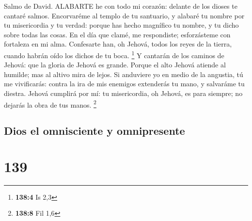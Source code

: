  Salmo de David. ALABARTE he con todo mi corazón: delante de
los dioses te cantaré salmos.  Encorvaréme al templo de tu
santuario, y alabaré tu nombre por tu misericordia y tu verdad: porque
has hecho magnífico tu nombre, y tu dicho sobre todas las cosas.
 En el día que clamé, me respondiste; esforzásteme con
fortaleza en mi alma.  Confesarte han, oh Jehová, todos los
reyes de la tierra, cuando habrán oído los dichos de tu boca.
\footnote{\textbf{138:4} Is 2,3}  Y cantarán de los caminos
de Jehová: que la gloria de Jehová es grande.  Porque el
alto Jehová atiende al humilde; mas al altivo mira de lejos.
 Si anduviere yo en medio de la angustia, tú me vivificarás:
contra la ira de mis enemigos extenderás tu mano, y salvaráme tu
diestra.  Jehová cumplirá por mí: tu misericordia, oh
Jehová, es para siempre; no dejarás la obra de tus manos. \footnote{\textbf{138:8}
  Fil 1,6}

\hypertarget{dios-el-omnisciente-y-omnipresente}{%
\subsection{Dios el omnisciente y
omnipresente}\label{dios-el-omnisciente-y-omnipresente}}

\hypertarget{section-138}{%
\section{139}\label{section-138}}

